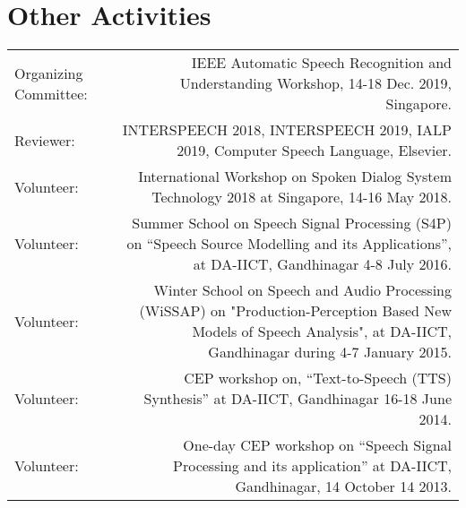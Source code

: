 \documentclass[10pt]{article}
\begin{document}
\section*{Other Activities}
\begin{tabular}{L!{\VRule}R}
Organizing Committee: & IEEE Automatic Speech Recognition and Understanding Workshop, 14-18 Dec. 2019, Singapore.\vspace{0.2cm}\\
Reviewer: & INTERSPEECH 2018, INTERSPEECH 2019, IALP 2019, Computer Speech Language, Elsevier.\vspace{0.2cm}\\
Volunteer:&International Workshop on Spoken Dialog System Technology 2018 at Singapore, 14-16 May 2018.\vspace{0.2cm}\\
Volunteer:&Summer School on Speech Signal Processing (S4P) on ``Speech Source Modelling and its Applications'', at {DA-IICT, Gandhinagar} 4-8 July 2016.\vspace{0.2cm}\\
Volunteer:& Winter School on Speech and Audio Processing (WiSSAP) on "Production-Perception Based New Models of Speech Analysis", at DA-IICT, Gandhinagar during 4-7 January 2015.\vspace{0.2cm}\\
Volunteer: & CEP workshop on, ``Text-to-Speech (TTS) Synthesis'' at DA-IICT, Gandhinagar 16-18 June 2014.\vspace{0.2cm}\\
Volunteer:& One-day CEP workshop on ``Speech Signal Processing and its application'' at {DA-IICT, Gandhinagar}, 14 October 14 2013.
\end{tabular}
\end{document}
